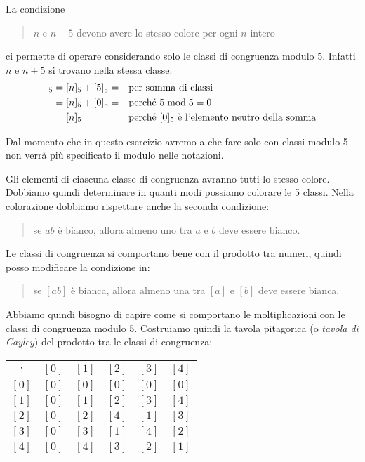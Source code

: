 \begin{soluzione}
    La condizione
    \begin{quotation}
        $n$ e $n + 5$ devono avere lo stesso colore per ogni $n$ intero
    \end{quotation}
    ci permette di operare considerando solo le classi di congruenza modulo 5.
    Infatti $n$ e $n + 5$ si trovano nella stessa classe:
    \begin{align*}
        [n + 5]_5 &= [n]_5 + [5]_5 = && \text{per somma di classi} \\
        &= [n]_5 + [0]_5 = && \text{perché $5 \modulo 5 = 0$} \\
        &= [n]_5 && \text{perché $[0]_5$ è l'elemento neutro della somma}
    \end{align*}

    Dal momento che in questo esercizio avremo a che fare solo con classi modulo 5 non verrà più specificato il modulo
    nelle notazioni.

    Gli elementi di ciascuna classe di congruenza avranno tutti lo stesso colore.
    Dobbiamo quindi determinare in quanti modi possiamo colorare le 5 classi.
    Nella colorazione dobbiamo rispettare anche la seconda condizione:
    \begin{quotation}
        se $ab$ è bianco, allora almeno uno tra $a$ e $b$ deve essere bianco.
    \end{quotation}

    Le classi di congruenza si comportano bene con il prodotto tra numeri, quindi posso modificare la condizione in:
    \begin{quotation}
        se $[ab]$ è bianca, allora almeno una tra $[a]$ e $[b]$ deve essere bianca.
    \end{quotation}

    Abbiamo quindi bisogno di capire come si comportano le moltiplicazioni con le classi di congruenza modulo 5.
    Costruiamo quindi la tavola pitagorica (o \emph{tavola di Cayley}) del prodotto tra le classi di congruenza:

    \begin{table}[H]
        \label{tab:distrettuali_2019}
        \centering
        \begin{tabular}{c|ccccc}
            $\cdot$ & $[0]$ & $[1]$ & $[2]$ & $[3]$ & $[4]$ \\
            \midrule
            $[0]$ & $[0]$ & $[0]$ & $[0]$ & $[0]$ & $[0]$ \\
            $[1]$ & $[0]$ & $[1]$ & $[2]$ & $[3]$ & $[4]$ \\
            $[2]$ & $[0]$ & $[2]$ & $[4]$ & $[1]$ & $[3]$ \\
            $[3]$ & $[0]$ & $[3]$ & $[1]$ & $[4]$ & $[2]$ \\
            $[4]$ & $[0]$ & $[4]$ & $[3]$ & $[2]$ & $[1]$
        \end{tabular}
    \end{table}


\end{soluzione}

